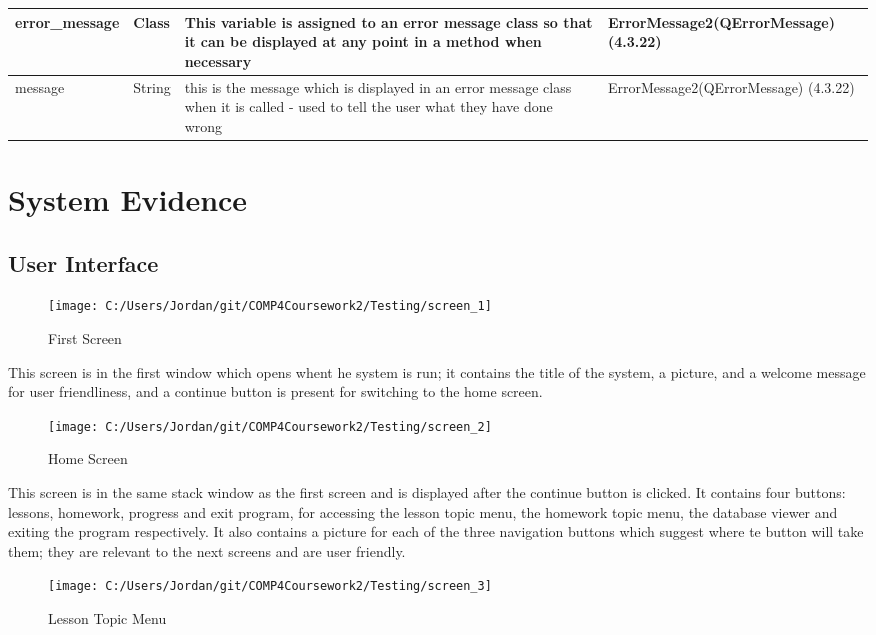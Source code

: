 \begin{center}
\begin{longtable}{|p{3cm}|p{3cm}|p{4cm}|p{4cm}|}
error\_message & Class & This variable is assigned to an error message class so that it can be displayed at any point in a method when necessary & ErrorMessage2(QErrorMessage) (4.3.22) \\ \hline
message & String & this is the message which is displayed in an error message class when it is called - used to tell the user what they have done wrong & ErrorMessage2(QErrorMessage) (4.3.22) \\ \hline
\end{longtable}
\end{center}

\section{System Evidence}

\subsection{User Interface}

\begin{figure}[H]
    \label{fig: Second Screen}\caption{First Screen}
    \texttt{[image: C:/Users/Jordan/git/COMP4Coursework2/Testing/screen\_1]}
\end{figure}

This screen is in the first window which opens whent he system is run; it contains the title of the system, a picture, and a welcome message for user friendliness, and a continue button is present for switching to the home screen.

\begin{figure}[H]
    \label{fig: Second Screen}\caption{Home Screen}
    \texttt{[image: C:/Users/Jordan/git/COMP4Coursework2/Testing/screen\_2]}
\end{figure}

This screen is in the same stack window as the first screen and is displayed after the continue button is clicked. It contains four buttons: lessons, homework, progress and exit program, for accessing the lesson topic menu, the homework topic menu, the database viewer and exiting the program respectively. It also contains a picture for each of the three navigation buttons which suggest where te button will take them; they are relevant to the next screens and are user friendly.

\begin{figure}[H]
    \label{fig: Second Screen}\caption{Lesson Topic Menu}
    \texttt{[image: C:/Users/Jordan/git/COMP4Coursework2/Testing/screen\_3]}
\end{figure}

